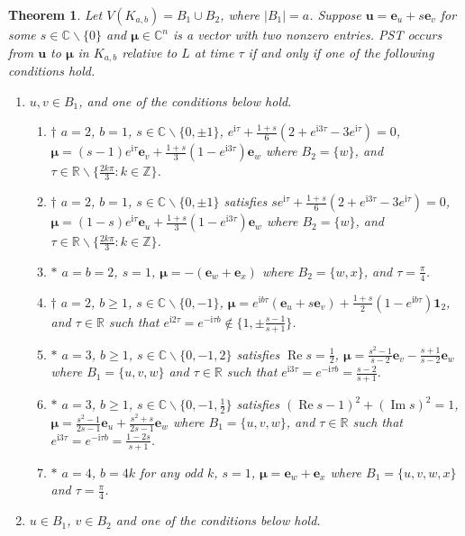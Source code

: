 \documentclass{article}
\numberwithin{equation}{section}
\newtheorem{theorem}[lemma]{Theorem}
\newcommand{\uno}{\mathbf 1}
\newcommand{\be}{\mathbf e}
\newcommand{\bu}{\mathbf u}
\newcommand{\bmu}{{\boldsymbol{\mu}}}
\def\C{\mathbb{C}}
\def\R{\mathbb{R}}
\def\Z{\mathbb{Z}}
\def\ii{\mathrm{i}}
\begin{document}
{\begin{theorem}
\label{Thm:kmnPST1}
Let $V(K_{a,b})=B_1\cup B_2$, where $|B_1|=a$. Suppose $\bu=\be_u+s\be_v$ for some $s\in\C\backslash\{0\}$ and $\bmu\in\C^n$ is a vector with two nonzero entries. PST occurs from $\bu$ to $\bmu$ in $K_{a,b}$ relative to $L$ at time $\tau$ if and only if one of the following conditions hold.
\begin{enumerate}
\item  $u,v\in B_1$, and one of the conditions below hold.
\begin{enumerate}
\item $\dagger$ $a=2$, $b=1$, $s\in\C\backslash\{0,\pm 1\}$, $e^{\ii\tau}+\frac{1+s}{6}(2+e^{\ii 3\tau}-3e^{\ii \tau})=0$, $\bmu=(s-1)e^{\ii\tau}\be_v+\frac{1+s}{3}(1-e^{\ii3\tau})\be_w$ where $B_2=\{w\}$, and $\tau\in\R\backslash\{\frac{2k\pi}{3}:k\in\Z\}$.%
\item $\dagger$ $a=2$, $b=1$,  $s\in\C\backslash\{0,\pm 1\}$ satisfies $se^{\ii\tau}+\frac{1+s}{6}(2+e^{\ii 3\tau}-3e^{\ii \tau})=0$, $\bmu=(1-s)e^{\ii\tau}\be_u+\frac{1+s}{3}(1-e^{\ii3\tau})\be_w$ where $B_2=\{w\}$, and $\tau\in\R\backslash\{\frac{2k\pi}{3}:k\in\Z\}$.%
\item $*$ $a=b=2$, $s=1$, $\bmu=-(\be_w+\be_x)$ where $B_2=\{w,x\}$, and $\tau=\frac{\pi}{4}$.
\item $\dagger$
$a=2$, $b\geq 1$, $s\in\C\backslash\{0,-1\}$, $\bmu=e^{\ii b \tau}(\be_u+s\be_v)+\frac{1+s}{2}(1- e^{\ii b \tau})\uno_2$, and $\tau\in\R$ such that $e^{\ii2\tau }=e^{-\ii\tau b }\notin\{1,\pm\frac{s-1}{s+1}\}$.
\item $*$ $a=3$, $b\geq 1$, $s\in\C\backslash\{0,-1,2\}$ satisfies $\operatorname{Re}s=\frac{1}{2}$, $\bmu=\frac{s^2-1}{s-2}\be_v-\frac{s+1}{s-2}\be_w$ where $B_1=\{u,v,w\}$ and $\tau\in\R$ such that %
$e^{\ii3\tau }=e^{-\ii\tau b }=\frac{s-2}{s+1}$.
\item $*$ $a=3$, $b\geq 1$, $s\in\C\backslash\{0,-1,\frac{1}{2}\}$ satisfies $(\operatorname{Re}s-1)^2+(\operatorname{Im}s)^2=1$, $\bmu=\frac{s^2-1}{2s-1}\be_u+\frac{s^2+s}{2s-1}\be_w$ where $B_1=\{u,v,w\}$, and $\tau\in\R$ such that 
$e^{\ii3\tau}=e^{-\ii\tau b }=\frac{1-2s}{s+1}$.
\item %
$*$ $a=4$, $b=4k$ for any odd $k$, $s=1$, $\bmu=\be_w+\be_x$ where $B_1=\{u,v,w,x\}$ and $\tau=\frac{\pi}{4}$.
\end{enumerate}
\item $u\in B_1$, $v\in B_2$ and one of the conditions below hold.

\end{enumerate}
\end{theorem}}
\end{document}
